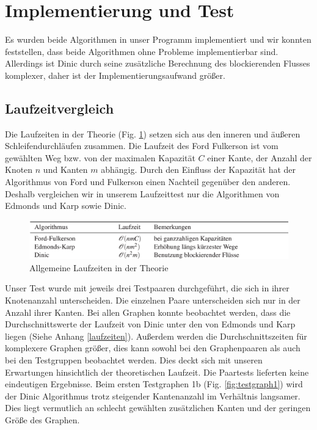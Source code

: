 \documentclass[a4paper]{llncs}
\begin{document}
\section{Implementierung und Test}
\label{Experimente}
Es wurden beide Algorithmen in unser Programm implementiert und wir konn\-ten feststellen, dass beide Algorithmen ohne Probleme implementierbar sind. Allerdings ist Dinic durch seine zusätzliche Berechnung des blockierenden Flusses komplexer, daher ist der Implementierungsaufwand größer.
\subsection{Laufzeitvergleich}
Die Laufzeiten in der Theorie (Fig. \ref{fig:lzvergleich}) setzen sich aus den inneren und äußeren Schleifendurchläufen zusammen.
Die Laufzeit des Ford Fulkerson ist vom gewählten Weg bzw. von der maximalen Kapazität $C$ einer Kante, der Anzahl der Knoten $n$ und Kanten $m$  abhängig.
Durch den Einfluss der Kapazität hat der Algorithmus von Ford und Fulkerson einen Nachteil gegenüber den anderen.
Deshalb vergleichen wir in unserem Laufzeittest nur die Algorithmen von Edmonds und Karp sowie Dinic.
\begin{figure}[H] 
  \centering
     \includegraphics[scale=0.42]{lzvergleich} 
  \caption{Allgemeine Laufzeiten in der Theorie \citep{GKuA}}
  \label{fig:lzvergleich}
\end{figure}
Unser Test wurde mit jeweils drei Testpaaren durchgeführt, die sich in ihrer Knotenanzahl unterscheiden.
Die einzelnen Paare unterscheiden sich nur in der Anzahl ihrer Kanten.
Bei allen Graphen konnte beobachtet werden, dass die Durchschnittswerte der Laufzeit von Dinic unter den von Edmonds und Karp liegen (Siehe Anhang \ref{laufzeiten}). 
Außerdem werden die Durchschnittszeiten für komplexere Graphen größer, dies kann sowohl bei den Graphenpaaren als auch bei den Testgruppen beobachtet werden.
Dies deckt sich mit unseren Erwartungen hinsichtlich der theoretischen Laufzeit.
Die Paartests lieferten keine eindeutigen Ergebnisse. Beim ersten Testgraphen 1b (Fig. \ref{fig:testgraph1}) wird der Dinic Algorithmus trotz steigender Kantenanzahl im Verhältnis langsamer. Dies liegt vermutlich an schlecht gewählten zusätzlichen Kanten und der geringen Größe des Graphen.
\end{document}
